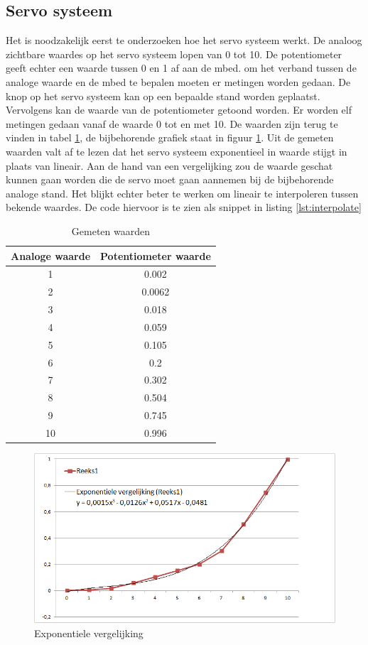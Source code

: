 \documentclass[a4paper]{article}
\begin{document}
		\subsection{Servo systeem}
		Het is noodzakelijk eerst te onderzoeken hoe het servo systeem werkt. De analoog zichtbare waardes op het servo systeem lopen van 0 tot 10. De potentiometer geeft echter een waarde tussen 0 en 1 af aan de mbed. om het verband tussen de analoge waarde en de mbed te bepalen moeten er metingen worden gedaan. De knop op het servo systeem kan op een bepaalde stand worden geplaatst. Vervolgens kan de waarde van de potentiometer getoond worden. Er worden elf metingen gedaan vanaf de waarde 0 tot en met 10. De waarden zijn terug te vinden in tabel \ref{tab:gemeten}, de bijbehorende grafiek staat in figuur \ref{fig:logaritmisch}. Uit de gemeten waarden valt af te lezen dat het servo systeem exponentieel in waarde stijgt in plaats van lineair. Aan de hand van een vergelijking zou de waarde geschat kunnen gaan worden die de servo moet gaan aannemen bij de bijbehorende analoge stand. Het blijkt echter beter te werken om lineair te interpoleren tussen bekende waardes. De code hiervoor is te zien als snippet in listing \ref{lst:interpolate}\\
	\begin{table}[h]
		\begin{centering}
			\begin{tabular}{| c | c |}
				\hline
				Analoge waarde & Potentiometer waarde \\ \hline\hline
				1 & 0.002 \\\hline
				2 & 0.0062 \\\hline
				3 & 0.018 \\\hline
				4 & 0.059 \\\hline
				5 & 0.105 \\\hline
				6 & 0.2 \\\hline
				7 & 0.302 \\\hline
				8 & 0.504 \\\hline
				9 & 0.745 \\\hline
				10 & 0.996 \\
				\hline
			\end{tabular}
			\caption{Gemeten waarden}
			\label{tab:gemeten}
		\end{centering}
	\end{table}
	\begin{figure}[h]
		\centering
		\includegraphics[scale=0.8]{imgs/logaritmisch.png}
		\caption{Exponentiele vergelijking}
		\label{fig:logaritmisch}
	\end{figure}
\end{document}
